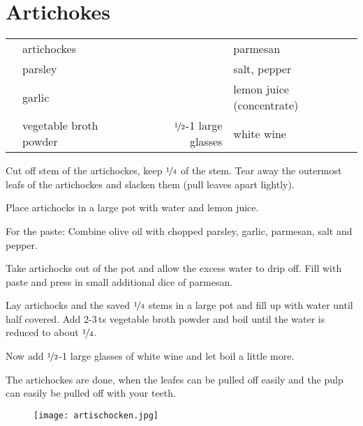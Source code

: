 \section{Artichokes}

\begin{centering}

\end{centering}

\begin{table}[H]
  \centering
  \begin{tabular*}{1\textwidth}{rlrl}
& artichockes & & parmesan \\
 & parsley & & salt, pepper \\
 & garlic & & lemon juice (concentrate) \\
 & vegetable broth powder & $\nicefrac{1}{2}$-1 large glasses & white wine \\
\end{tabular*}
\end{table}

\begin{Notes}
\item Cut off stem of the artichockes, keep $\nicefrac{1}{4}$ of the stem. Tear away the outermost leafs of the artichockes and slacken them (pull leaves apart lightly).
\item Place artichocks in a large pot with water and lemon juice.
\item For the paste: Combine olive oil with chopped parsley, garlic, parmesan, salt and pepper.
\item Take artichocks out of the pot and allow the excess water to drip off. Fill with paste and press in small additional dice of parmesan.
\item Lay artichocks and the saved $\nicefrac{1}{4}$ stems in a large pot and fill up with water until half covered. Add 2-3\,ts vegetable broth powder and boil until the water is reduced to about $\nicefrac{1}{4}$.
\item Now add $\nicefrac{1}{2}$-1 large glasses of white wine and let boil a little more.
  \item The artichockes are done, when the leafes can be pulled off easily and the pulp can easily be pulled off with your teeth.
\end{Notes}
\vfill
\begin{figure}[H]
  \centering
  \texttt{[image: artischocken.jpg]}
\end{figure}
\newpage

